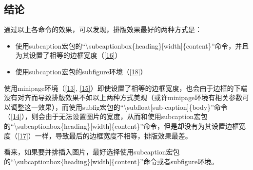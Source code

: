 \documentclass{article}
\begin{document}
\subsection{结论}
    通过以上各命令的效果，可以发现，排版效果最好的两种方式是：

    \begin{itemize}
        \item 使用subcaption宏包的``\textbackslash subcaptionbox\{heading\}[width]\{content\}''命令，并且为其设置了相等的边框宽度（\ref{16}）
        \item 使用subcaption宏包的subfigure环境（\ref{18}）
    \end{itemize}
    
    使用minipage环境（\ref{13}, \ref{15}）即使设置了相等的边框宽度，也会由于边框的下端没有对齐而导致排版效果不如以上两种方式美观（或许minipage环境有相关参数可以调整这一效果），而使用subfig宏包的``\textbackslash subfloat[sub-caption]\{body\}''命令（\ref{14}），则会由于无法设置图片的宽度，从而和使用subcaption宏包的``\textbackslash subcaptionbox\{heading\}[width]\{content\}''命令，但是却没有为其设置边框宽度（\ref{17}）一样，导致最后的边框宽度不相等，排版效果最差。
    
    看来，如果要并排插入图片，最好选择使用subcaption宏包的``\textbackslash subcaptionbox\{heading\}[width]\{content\}''命令或者subfigure环境。
    
\clearpage

\listoffigures
\end{document}
